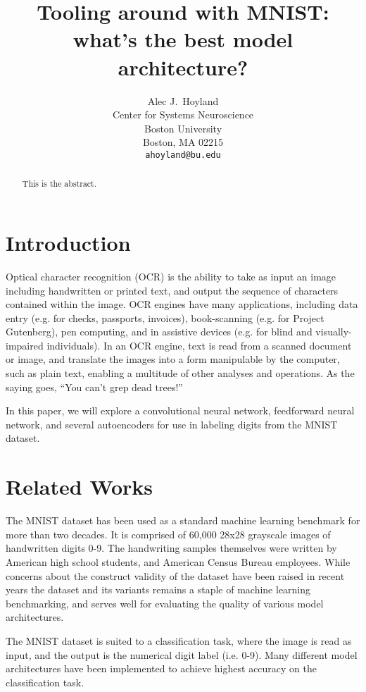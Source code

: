 \documentclass{article}
\title{Tooling around with MNIST: what's the best model architecture?}
\author{%
  Alec J.~Hoyland \\
  Center for Systems Neuroscience\\
  Boston University\\
  Boston, MA 02215 \\
  \texttt{ahoyland@bu.edu} \\
}
\begin{document}
\maketitle

\begin{abstract}
  This is the abstract.
\end{abstract}

\section{Introduction}

Optical character recognition (OCR) is the ability to take as input an image including handwritten or printed text,
and output the sequence of characters contained within the image.
OCR engines have many applications, including data entry (e.g. for checks, passports, invoices),
book-scanning (e.g. for Project Gutenberg), pen computing, and in assistive devices
(e.g. for blind and visually-impaired individuals).
In an OCR engine, text is read from a scanned document or image,
and translate the images into a form manipulable by the computer, such as plain text,
enabling a multitude of other analyses and operations.
As the saying goes, ``You can't grep dead trees!''

In this paper, we will explore a convolutional neural network, feedforward neural network,
and several autoencoders for use in labeling digits from the MNIST dataset.

\section{Related Works}

The MNIST dataset \citep{bottouComparisonClassifierMethods1994, HandwrittenDigitDatabase}
has been used as a standard machine learning benchmark
for more than two decades.
It is comprised of 60,000 28x28 grayscale images of handwritten digits 0-9.
The handwriting samples themselves were written by American high school students,
and American Census Bureau employees.
While concerns about the construct validity of the dataset have been raised in recent years \citep{yadavColdCaseLost2019}
the dataset and its variants remains a staple of machine learning benchmarking,
and serves well for evaluating the quality of various model architectures.

The MNIST dataset is suited to a classification task,
where the image is read as input, and the output is the numerical digit label (i.e. 0-9).
Many different model architectures have been implemented to achieve highest accuracy on the classification task.
\end{document}
